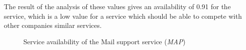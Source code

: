 %
The result of the analysis of these values gives an availability of 0.91 for the service, which is a low value for a service which should be able to compete with other companies similar services.
\begin{center}
	\begin{figure}[H]
		\centering
		\setlength\fboxsep{7pt}
		\setlength\fboxrule{0.5pt}
		\caption{Service availability of the Mail support service (\emph{MAP})}
		\label{fig:map_support_mail_availability}
	\end{figure}
\end{center}

%
